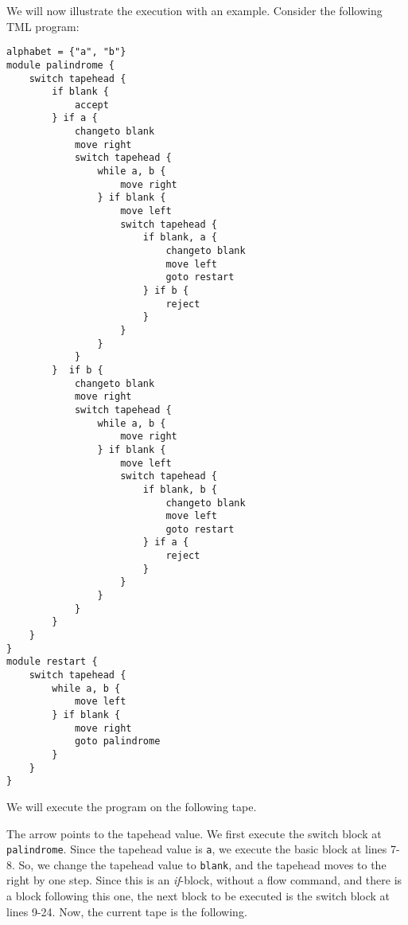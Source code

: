 We will now illustrate the execution with an example. Consider the following TML program:
\begin{lstlisting}[language=TML]
alphabet = {"a", "b"}
module palindrome {
    switch tapehead {
        if blank {
            accept
        } if a {
            changeto blank
            move right
            switch tapehead {
                while a, b {
                    move right
                } if blank {
                    move left
                    switch tapehead {
                        if blank, a {
                            changeto blank
                            move left
                            goto restart
                        } if b {
                            reject
                        }
                    }
                }
            }
        }  if b {
            changeto blank
            move right
            switch tapehead {
                while a, b {
                    move right
                } if blank {
                    move left
                    switch tapehead {
                        if blank, b {
                            changeto blank
                            move left
                            goto restart
                        } if a {
                            reject
                        }
                    }
                }
            }
        }
    }
}
module restart {
    switch tapehead {
        while a, b {
            move left
        } if blank {
            move right
            goto palindrome
        }
    }
}
\end{lstlisting}
We will execute the program on the following tape.
\begin{figure}[H]
    \centering
\end{figure}
\noindent The arrow points to the tapehead value. We first execute the switch block at \texttt{palindrome}. Since the tapehead value is \texttt{a}, we execute the basic block at lines 7-8. So, we change the tapehead value to \texttt{blank}, and the tapehead moves to the right by one step. Since this is an \textit{if}-block, without a flow command, and there is a block following this one, the next block to be executed is the switch block at lines 9-24. Now, the current tape is the following.
